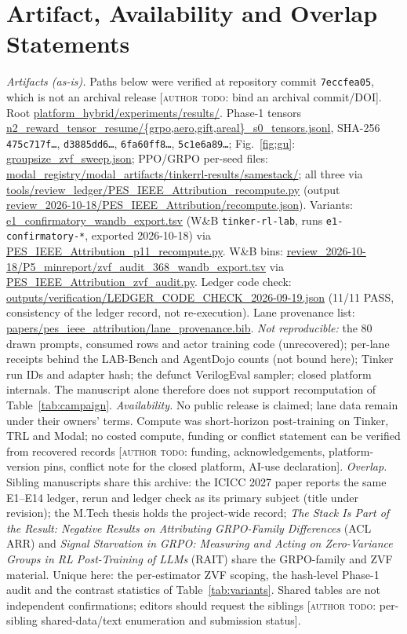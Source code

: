 \documentclass[conference]{IEEEtran}
\newcommand{\authortodo}[1]{[\textsc{author todo}: #1]}
\begin{document}
\appendices
\section{Artifact, Availability and Overlap Statements}
\emph{Artifacts (as-is).} Paths below were verified at repository commit
\texttt{7eccfea05}, which is not an archival release
\authortodo{bind an archival commit/DOI}. Root
\url{platform_hybrid/experiments/results/}. Phase-1 tensors
\url{n2_reward_tensor_resume/{grpo,aero,gift,areal}_s0_tensors.jsonl},
SHA-256 \texttt{475c717f\ldots}, \texttt{d3885dd6\ldots},
\texttt{6fa60ff8\ldots}, \texttt{5c1e6a89\ldots}; Fig.~\ref{fig:gu}:
\url{groupsize_zvf_sweep.json}; PPO/GRPO per-seed files:
\url{modal_registry/modal_artifacts/tinkerrl-results/samestack/}; all
three via \url{tools/review_ledger/PES_IEEE_Attribution_recompute.py}
(output \url{review_2026-10-18/PES_IEEE_Attribution/recompute.json}).
Variants: \url{e1_confirmatory_wandb_export.tsv} (W\&B
\texttt{tinker-rl-lab}, runs \texttt{e1-confirmatory-*}, exported
2026-10-18) via \url{PES_IEEE_Attribution_p11_recompute.py}. W\&B
bins: \url{review_2026-10-18/P5_minreport/zvf_audit_368_wandb_export.tsv}
via \url{PES_IEEE_Attribution_zvf_audit.py}. Ledger code check:
\url{outputs/verification/LEDGER_CODE_CHECK_2026-09-19.json} (11/11
PASS, consistency of the ledger record, not re-execution). Lane provenance
list: \url{papers/pes_ieee_attribution/lane_provenance.bib}.
\emph{Not reproducible:} the 80 drawn prompts, consumed rows and actor
training code (unrecovered); per-lane receipts behind the LAB-Bench and
AgentDojo counts (not bound here); Tinker run IDs and adapter hash; the
defunct VerilogEval sampler; closed platform internals. The manuscript alone
therefore does not support recomputation of Table~\ref{tab:campaign}.
\emph{Availability.} No public release is claimed; lane data remain under
their owners' terms. Compute was short-horizon post-training on Tinker,
TRL and Modal; no costed compute, funding or conflict statement can be
verified from recovered records \authortodo{funding, acknowledgements,
platform-version pins, conflict note for the closed platform, AI-use
declaration}. \emph{Overlap.} Sibling manuscripts share this archive: the
ICICC 2027 paper reports the same E1--E14 ledger, rerun and ledger check as
its primary subject (title under revision); the M.Tech thesis holds the
project-wide record; \emph{The Stack Is Part of the Result: Negative
Results on Attributing GRPO-Family Differences} (ACL ARR) and \emph{Signal
Starvation in GRPO: Measuring and Acting on Zero-Variance Groups in RL
Post-Training of LLMs} (RAIT) share the GRPO-family and ZVF material. Unique
here: the per-estimator ZVF scoping, the hash-level Phase-1 audit and the
contrast statistics of Table~\ref{tab:variants}. Shared tables are not
independent confirmations; editors should request the siblings
\authortodo{per-sibling shared-data/text enumeration and submission
status}.



\end{document}
